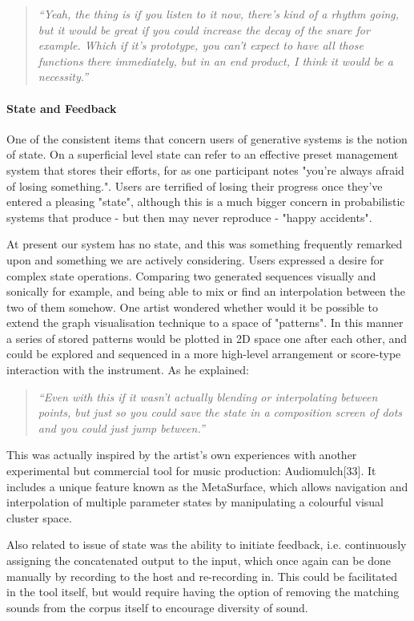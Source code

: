 \blockquote{\textit{“Yeah, the thing is if you listen to it now, there's kind of a rhythm going, but it would be great if you could increase the decay of the snare for example. Which if it's prototype, you can't expect to have all those functions there immediately, but in an end product, I think it would be a necessity.”}}

\paragraph{State and Feedback}

One of the consistent items that concern users of generative systems is the notion of state. On a superficial level state can refer to an effective preset management system that stores their efforts, for as one participant notes "you're always afraid of losing something.". Users are terrified of losing their progress once they've entered a pleasing "state", although this is a much bigger concern in probabilistic systems that produce - but then may never reproduce - "happy accidents".

At present our system has no state, and this was something frequently remarked upon and something we are actively considering. Users expressed a desire for complex state operations. Comparing two generated sequences visually and sonically for example, and being able to mix or find an interpolation between the two of them somehow. One artist wondered whether would it be possible to extend the graph visualisation technique to a space of "patterns". In this manner a series of stored patterns would be plotted in 2D space one after each other, and could be explored and sequenced in a more high-level arrangement or score-type interaction with the instrument. As he explained:

\blockquote{\textit{“Even with this if it wasn't actually blending or interpolating between points, but just so you could save the state in a composition screen of dots and you could just jump between.”}}

This was actually inspired by the artist's own experiences with another experimental but commercial tool for music production: Audiomulch[33]. It includes a unique feature known as the MetaSurface, which allows navigation and interpolation of multiple parameter states by manipulating a colourful visual cluster space.

Also related to issue of state was the ability to initiate feedback, i.e. continuously assigning the concatenated output to the input, which once again can be done manually by recording to the host and re-recording in. This could be facilitated in the tool itself, but would require having the option of removing the matching sounds from the corpus itself to encourage diversity of sound.

